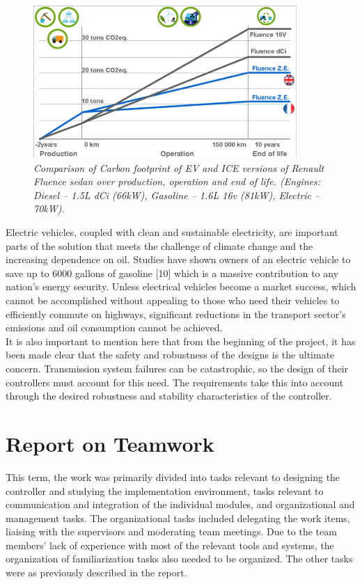 \documentclass{article}
\begin{document}
\begin{figure}[!ht]
\centering 
\includegraphics[width=10cm]{fig_11.png}
\caption{\small \sl Comparison of Carbon footprint of EV and ICE versions of Renault Fluence sedan over production, operation and end of life. (Engines: Diesel – 1.5L dCi (66kW), Gasoline – 1.6L 16v (81kW), Electric – 70kW).}  
\end{figure}

\noindent Electric vehicles, coupled with clean and sustainable electricity, are important parts of the solution that meets the challenge of climate change and the increasing dependence on oil. Studies have shown owners of an electric vehicle to save up to 6000 gallons of gasoline [10] which is a massive contribution to any nation’s energy security. Unless electrical vehicles become a market success, which cannot be accomplished without appealing to those who need their vehicles to efficiently commute on highways, significant reductions in the transport sector’s emissions and oil consumption cannot be achieved. \\

\noindent It is also important to mention here that from the beginning of the project, it has been made clear that the safety and robustness of the designs is the ultimate concern. Transmission system failures can be catastrophic, so the design of their controllers must account for this need. The requirements take this into account through the desired robustness and stability characteristics of the controller. \\

\section{Report on Teamwork}
This term, the work was primarily divided into tasks relevant to designing the controller and studying the implementation environment, tasks relevant to communication and integration of the individual modules, and organizational and management tasks. The organizational tasks included delegating the work items, liaising with the supervisors and moderating team meetings. Due to the team members’ lack of experience with most of the relevant tools and systems, the organization of familiarization tasks also needed to be organized. The other tasks were as previously described in the report.\\
\end{document}
